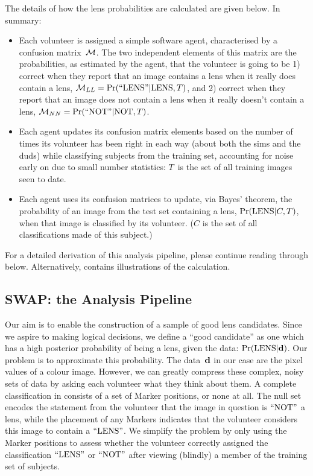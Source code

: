 \documentclass[useAMS,usenatbib,a4paper]{mn2e}
\begin{document}
The details of how the lens probabilities are calculated are given below.
In summary:
\begin{itemize}

\item Each volunteer is assigned a simple software agent, characterised by a
confusion matrix~$\mathcal{M}$. The two independent elements of this matrix are the
probabilities, as estimated by the agent, that the volunteer is going to be 1)
correct when they report that an image contains a lens when it really does
contain a lens, $\mathcal{M}_{LL} = {\rm Pr}({\rm ``LENS"}|{\rm LENS},T)$, and 2) correct when they report that
an image does not contain a lens when it really doesn't contain a lens,
$\mathcal{M}_{NN} = {\rm Pr}({\rm ``NOT"}|{\rm NOT},T)$.

\item Each agent updates its confusion matrix elements based on the number of
times its volunteer has been right in each way (about both the sims and the
duds) while classifying subjects from the training set, accounting for noise
early on due to small number statistics: $T$~is the set of all training images
seen to date.

\item Each agent uses its confusion matrices to update, via Bayes' theorem,
the probability of an image from the test set containing a lens,
${\rm Pr}({\rm LENS}|C,T)$, when that image is classified by its volunteer. ($C$ is the
set of all classifications made of this subject.)

\end{itemize}

For a detailed derivation of this analysis pipeline, please continue reading
through  below. Alternatively,
 contains illustrations of the calculation.



\subsection{SWAP: the \SW Analysis Pipeline}
\label{sec:swap:details}

Our aim is to enable the construction of a sample of good lens candidates.
Since we aspire to making logical  decisions, we define a  ``good candidate''
as one which has a high posterior probability of being a lens, given the data:
${\rm Pr}({\rm LENS}|{\mathbf{d}})$. Our problem is to approximate this probability. The data~${\mathbf{d}}$
in our case are the pixel values of a colour image. However, we can greatly
compress these complex, noisy sets of data by asking each volunteer what they
think about them. A complete  classification in \SW consists of a set of
Marker positions, or none at all. The null set encodes the statement from
the volunteer that the image in question is ${\rm ``NOT"}$ a lens, while the
placement of any  Markers indicates that the volunteer considers this image to
contain a ${\rm ``LENS"}$.  We simplify the problem by only using the Marker
positions to assess whether the volunteer  correctly assigned the
classification ${\rm ``LENS"}$ or ${\rm ``NOT"}$ after viewing (blindly) a member of
the training set of subjects.
\end{document}
